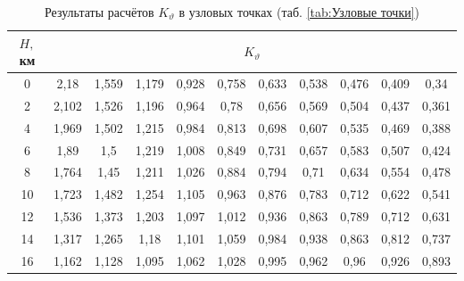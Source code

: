     \begin{table}[H]
    \centering
    \caption{Результаты расчётов $K_{\vartheta}$ в узловых точках (таб. \ref{tab:Узловые точки})}
    \label{tab:Результаты расчётов K_\vartheta}
    \begin{tabular}{|c|c|c|c|c|c|c|c|c|c|c|}
    \hline
        $H,$ км &\multicolumn{10}{|c|}{$K_{\vartheta}$ } \\ \hline
        0 & 2,18 & 1,559 & 1,179 & 0,928 & 0,758 & 0,633 & 0,538 & 0,476 & 0,409 & 0,34  \\ \hline
        2 & 2,102 & 1,526 & 1,196 & 0,964 & 0,78 & 0,656 & 0,569 & 0,504 & 0,437 & 0,361  \\ \hline
        4 & 1,969 & 1,502 & 1,215 & 0,984 & 0,813 & 0,698 & 0,607 & 0,535 & 0,469 & 0,388  \\ \hline
        6 & 1,89 & 1,5 & 1,219 & 1,008 & 0,849 & 0,731 & 0,657 & 0,583 & 0,507 & 0,424  \\ \hline
        8 & 1,764 & 1,45 & 1,211 & 1,026 & 0,884 & 0,794 & 0,71 & 0,634 & 0,554 & 0,478  \\ \hline
        10 & 1,723 & 1,482 & 1,254 & 1,105 & 0,963 & 0,876 & 0,783 & 0,712 & 0,622 & 0,541  \\ \hline
        12 & 1,536 & 1,373 & 1,203 & 1,097 & 1,012 & 0,936 & 0,863 & 0,789 & 0,712 & 0,631  \\ \hline
        14 & 1,317 & 1,265 & 1,18 & 1,101 & 1,059 & 0,984 & 0,938 & 0,863 & 0,812 & 0,737  \\ \hline
        16 & 1,162 & 1,128 & 1,095 & 1,062 & 1,028 & 0,995 & 0,962 & 0,96 & 0,926 & 0,893  \\ \hline
    \end{tabular}
\end{table}

